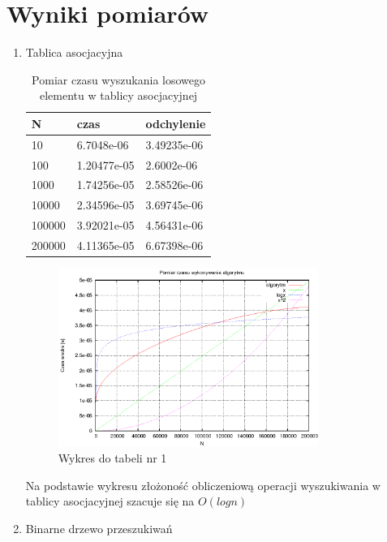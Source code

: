 \documentclass[a4paper,11pt]{article}
\begin{document}
\section{Wyniki pomiarów}
\begin{enumerate}
 \item Tablica asocjacyjna
   
  \begin{table}[th]
  \centering
    \caption{Pomiar czasu wyszukania losowego elementu w tablicy asocjacyjnej}

      \begin{tabular}{|l|l|l|}
	\hline
	N & czas & odchylenie \\
    \hline
  10 & 6.7048e-06 &  3.49235e-06\\
  \hline
100 & 1.20477e-05 &  2.6002e-06\\
\hline
1000 & 1.74256e-05 &  2.58526e-06\\
\hline
10000 & 2.34596e-05 &  3.69745e-06\\
\hline
100000 & 3.92021e-05 &  4.56431e-06\\
\hline
200000 & 4.11365e-05 &  6.67398e-06\\
\hline
    \end{tabular}
    \end{table}
    \newpage
 \begin{figure}[th]
\centering
\includegraphics[width=0.8\textwidth]{../prj/wykres12.eps}
\caption{Wykres do tabeli nr 1}
\label{Wykres do tabeli nr 1}
\end{figure} 
Na podstawie wykresu złożoność obliczeniową operacji wyszukiwania w tablicy asocjacyjnej szacuje się na $ O(logn) $
\item Binarne drzewo przeszukiwań

  \begin{table}[th]
  \centering
  

\end{table}
\end{enumerate}
\end{document}
